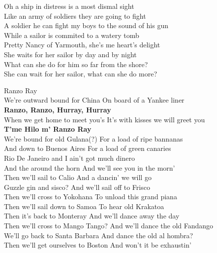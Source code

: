 \documentclass[letterpaper,9pt]{article}
\begin{document}
Oh a ship in distress is a most dismal sight \\
Like an army of soldiers they are going to fight \\
A soldier he can fight my boys to the sound of his gun \\
While a sailor is commited to a watery tomb \\

Pretty Nancy of Yarmouth, she's me heart's delight \\
She waits for her sailor by day and by night \\
What can she do for him so far from the shore? \\
She can wait for her sailor, what can she do more? \\

\newpage
{}
\Huge
Ranzo Ray\\

\LARGE
We’re outward bound for China On board of a Yankee liner \\
\textbf{Ranzo, Ranzo, Hurray, Hurray} \\
When we get home to meet you’s It’s with kisses we will greet you \\
\textbf{T’me Hilo m’ Ranzo Ray} \\

We’re bound for old Gulana(?) For a load of ripe bannanas \\
And down to Buenos Aires For a load of green canaries \\

Rio De Janeiro and I ain’t got much dinero \\
And the around the horn And we’ll see you in the morn’ \\

Then we’ll sail to Calio And a dancin’ we will go \\
Guzzle gin and sisco? And we’ll sail off to Frisco \\

Then we’ll cross to Yokohana To unload this grand piana \\
Then we’ll sail down to Samoa To hear old Krakatoa \\

Then it’s back to Monteray And we’ll dance away the day \\
Then we’ll cross to Mango Tango? And we’ll dance the old Fandango \\

We’ll go back to Santa Barbara And dance the old al hombra? \\
Then we’ll get ourselves to Boston And won’t it be exhaustin’ \\
\end{document}
